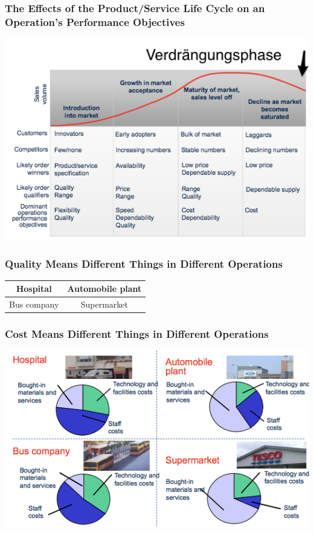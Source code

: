 \subsubsection{The Effects of the Product/Service Life Cycle on an Operation’s Performance Objectives}
\includegraphics[width=1\textwidth]{W02/productlifecycle}
\subsubsection{Quality Means Different Things in Different Operations}
\begin{center}
\begin{tabular}{|c|c|}
	\hline Hospital & Automobile plant \\ 
	\hline Bus company & Supermarket \\ 
	\hline 
\end{tabular} 
\end{center}
\subsubsection{Cost Means Different Things in Different Operations}
\includegraphics[width=1\textwidth]{W02/cost_operations}
